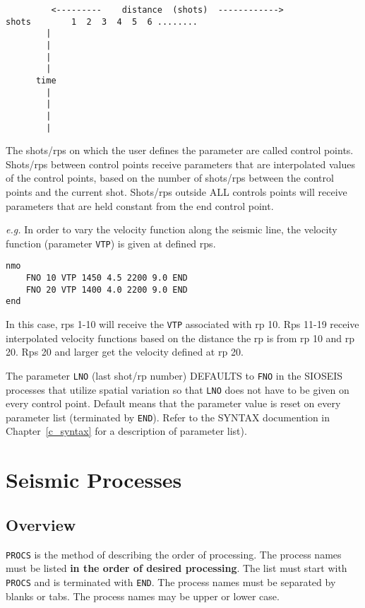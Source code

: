 \begin{verbatim}
         <---------    distance  (shots)  ------------>
shots        1  2  3  4  5  6 ........
        |
        |
        |
        |
      time
        |
        |
        |
        |
\end{verbatim}

The \glspl{shot}/\glspl{rp} on which the user defines the parameter are called control
points.  Shots/\glspl{rp} between control points receive parameters that are
interpolated values of the control points, based on the number of
\glspl{shot}/\glspl{rp} between the control points and the current \gls{shot}.  Shots/\glspl{rp}
outside ALL controls points will receive parameters that are held
constant from the end control point.

\textit{e.g.} In order to vary the velocity function along the seismic line, the
velocity function (parameter \texttt{VTP}) is given at defined \glspl{rp}.
\begin{verbatim}
nmo
    FNO 10 VTP 1450 4.5 2200 9.0 END
    FNO 20 VTP 1400 4.0 2200 9.0 END
end
\end{verbatim}
In this case, \glspl{rp} 1-10 will receive the \texttt{VTP} associated with \gls{rp} 10.
Rps 11-19 receive interpolated velocity functions based on the distance
the \gls{rp} is from \gls{rp} 10 and \gls{rp} 20.  Rps 20 and larger get the velocity
defined at \gls{rp} 20.

The parameter \texttt{LNO} (last \gls{shot}/\gls{rp} number) DEFAULTS to \texttt{FNO} in
the SIOSEIS processes that utilize spatial variation so that \texttt{LNO} does
not have to be given on every control point.  Default means that the parameter
value is reset on every parameter list (terminated by \texttt{END}).  Refer to
the SYNTAX documention in Chapter~\ref{c_syntax} for a description of parameter
list).

\chapter{Seismic Processes}
\label{c_seismic_processes}

\section{Overview}
\texttt{PROCS} is the method of describing the order of processing. The
process names must be listed \textbf{in the order of desired processing}. The
list must start with \texttt{PROCS} and is terminated with \texttt{END}. The
process names must be separated by blanks or tabs. The process names may be
upper or lower case.


